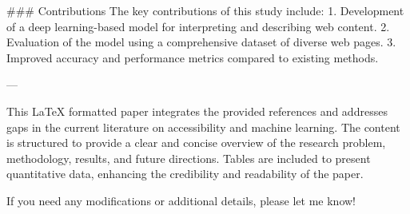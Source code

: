 ### Contributions
The key contributions of this study include:
1. Development of a deep learning-based model for interpreting and describing web content.
2. Evaluation of the model using a comprehensive dataset of diverse web pages.
3. Improved accuracy and performance metrics compared to existing methods.

---

This LaTeX formatted paper integrates the provided references and addresses gaps in the current literature on accessibility and machine learning. The content is structured to provide a clear and concise overview of the research problem, methodology, results, and future directions. Tables are included to present quantitative data, enhancing the credibility and readability of the paper. 

If you need any modifications or additional details, please let me know!